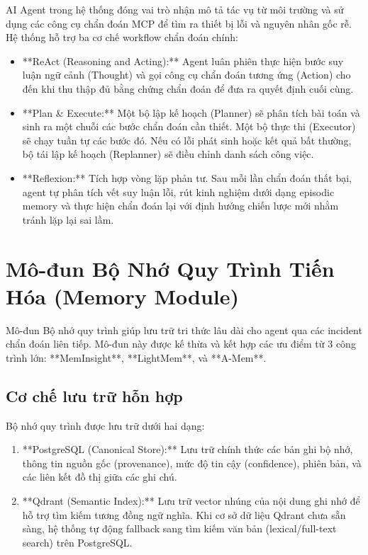 AI Agent trong hệ thống đóng vai trò nhận mô tả tác vụ từ môi trường và sử dụng các công cụ chẩn đoán MCP để tìm ra thiết bị lỗi và nguyên nhân gốc rễ. Hệ thống hỗ trợ ba cơ chế workflow chẩn đoán chính:
\begin{itemize}
    \item **ReAct (Reasoning and Acting):** Agent luân phiên thực hiện bước suy luận ngữ cảnh (Thought) và gọi công cụ chẩn đoán tương ứng (Action) cho đến khi thu thập đủ bằng chứng chẩn đoán để đưa ra quyết định cuối cùng.
    \item **Plan \& Execute:** Một bộ lập kế hoạch (Planner) sẽ phân tích bài toán và sinh ra một chuỗi các bước chẩn đoán cần thiết. Một bộ thực thi (Executor) sẽ chạy tuần tự các bước đó. Nếu có lỗi phát sinh hoặc kết quả bất thường, bộ tái lập kế hoạch (Replanner) sẽ điều chỉnh danh sách công việc.
    \item **Reflexion:** Tích hợp vòng lặp phản tư. Sau mỗi lần chẩn đoán thất bại, agent tự phân tích vết suy luận lỗi, rút kinh nghiệm dưới dạng episodic memory và thực hiện chẩn đoán lại với định hướng chiến lược mới nhằm tránh lặp lại sai lầm.
\end{itemize}

\section{Mô-đun Bộ Nhớ Quy Trình Tiến Hóa (Memory Module)}
\label{sec:memory_module}

Mô-đun Bộ nhớ quy trình giúp lưu trữ tri thức lâu dài cho agent qua các incident chẩn đoán liên tiếp. Mô-đun này được kế thừa và kết hợp các ưu điểm từ 3 công trình lớn: **MemInsight**, **LightMem**, và **A-Mem**.

\subsection{Cơ chế lưu trữ hỗn hợp}
Bộ nhớ quy trình được lưu trữ dưới hai dạng:
\begin{enumerate}
    \item **PostgreSQL (Canonical Store):** Lưu trữ chính thức các bản ghi bộ nhớ, thông tin nguồn gốc (provenance), mức độ tin cậy (confidence), phiên bản, và các liên kết đồ thị giữa các ghi chú.
    \item **Qdrant (Semantic Index):** Lưu trữ vector nhúng của nội dung ghi nhớ để hỗ trợ tìm kiếm tương đồng ngữ nghĩa. Khi cơ sở dữ liệu Qdrant chưa sẵn sàng, hệ thống tự động fallback sang tìm kiếm văn bản (lexical/full-text search) trên PostgreSQL.
\end{enumerate}

